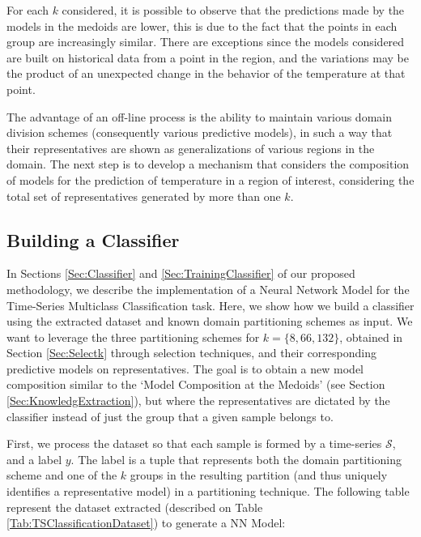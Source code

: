 For each $k$ considered, it is possible to observe that the predictions made by the models in the medoids are lower, this is due to the fact that the points in each group are increasingly similar. There are exceptions since the models considered are built on historical data from a point in the region, and the variations may be the product of an unexpected change in the behavior of the temperature at that point.

The advantage of an off-line process is the ability to maintain various domain division schemes (consequently various predictive models), in such a way that their representatives are shown as generalizations of various regions in the domain. The next step is to develop a mechanism that considers the composition of models for the prediction of temperature in a region of interest, considering the total set of representatives generated by more than one $k$. 

\subsection{Building a Classifier}
\label{Sec:ExperimentsTrainingClassifier}

In Sections \ref{Sec:Classifier} and \ref{Sec:TrainingClassifier} of our proposed methodology, we describe the implementation of a Neural Network Model for the Time-Series Multiclass Classification task. Here, we show how we build a classifier using the extracted dataset and known domain partitioning schemes as input. We want to leverage the three partitioning schemes for $k = \{8, 66, 132\}$, obtained in Section \ref{Sec:Selectk} through selection techniques, and their corresponding predictive models on representatives. The goal is to obtain a new model composition similar to the `Model Composition at the Medoids' (see Section \ref{Sec:KnowledgExtraction}), but where the representatives are dictated by the classifier instead of just the group that a given sample belongs to. 

First, we process the dataset so that each sample is formed by a time-series $\mathcal{S}$, and a label $y$. The label is a tuple that represents both the domain partitioning scheme and one of the $k$ groups in the resulting partition (and thus uniquely identifies a representative model) in a partitioning technique.  %
The following table represent the dataset extracted (described on Table \ref{Tab:TSClassificationDataset}) to generate a NN Model:


